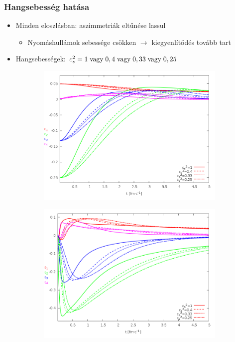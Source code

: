 \documentclass{beamer}
\begin{document}
\begin{frame}
\frametitle{Hangsebesség hatása}
\begin{center}
\begin{itemize}
\setlength{\itemsep}{12pt}
\item<1-> Minden eloszlásban: aszimmetriák eltűnése lassul
\vspace{8pt}
\begin{itemize}
\item<1-> Nyomáshullámok sebessége csökken $\rightarrow$ kiegyenlítődés tovább tart
\end{itemize}
\item Hangsebességek: $c_s^2=1\; \rm{vagy}\;0,4\; \rm{vagy}\; \rm{0,33}\; vagy\; \rm{0,25}$
\end{itemize}
\begin{figure}[H]
	\centering
    \begin{subfigure}[b]{0.49\textwidth}
    		\includegraphics[width=\textwidth]{pic/res/nonrel/eps_cs2_r}
	\end{subfigure}
	\begin{subfigure}[b]{0.49\textwidth}
        	\includegraphics[width=\textwidth]{pic/res/nonrel/eps_cs2_v}
	\end{subfigure}
\end{figure}
\end{center}
\end{frame}
\end{document}
